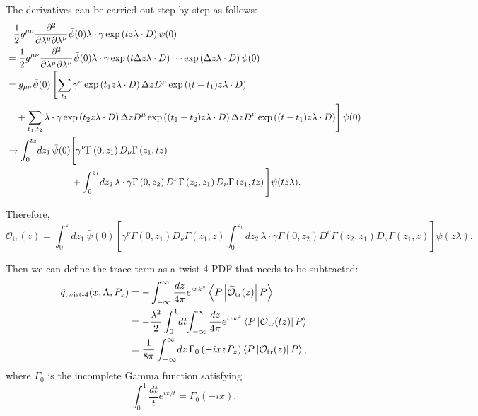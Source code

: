 The derivatives can be carried out step by step as follows:
%
\begin{align}
&\phantom{=}
  \frac{1}{2} g^{\mu\nu} \frac{\partial^2}
                              {\partial \lambda^\mu \partial \lambda^\nu}
  \bar{\psi}(0) \lambda \cdot \gamma
    \exp \left(tz\lambda \cdot D\right) \psi(0) \notag \\
%    
&= \frac{1}{2} g^{\mu\nu} \frac{\partial^2}
                               {\partial \lambda^\mu \partial \lambda^\nu}
  \bar{\psi}(0) \lambda \cdot \gamma
  \exp \left(t\Delta z\lambda \cdot D\right) \cdots
    \exp \left( \Delta z\lambda \cdot D\right) \psi(0) \notag \\
%
&= g_{\mu\nu} \bar{\psi}(0) \left[ \sum_{t_1}\gamma^\nu
  \exp \left(t_1 z\lambda \cdot D\right) \Delta z D^\mu
  \exp \left( (t-t_1) z\lambda \cdot D\right) \right.  \notag \\
&\phantom{=} \left. {}+\sum_{t_1,t_2} \lambda \cdot \gamma
  \exp \left( t_2 z\lambda \cdot D\right) \Delta z D^\mu
  \exp \left( (t_1-t_2) z\lambda \cdot D\right) \Delta z D^\nu
  \exp \left( (t-t_1) z\lambda \cdot D\right) \right]
  \psi(0)  \notag \\
%
&\rightarrow \int_0^{tz} \!dz_1\, \bar{\psi}(0) \Bigg[
  \gamma^\nu \Gamma\left(0,z_1\right) D_\nu \Gamma\left(z_1,tz\right) \notag \\
&\phantom{= \int_0^{tz} \!dz_1\, \bar{\psi}(0) \Bigg[}
  {} + \int_0^{z_1} \!dz_2\, \lambda \cdot \gamma
  \Gamma\left(0,z_2\right) D^\nu \Gamma\left(z_2,z_1\right)
  D_\nu \Gamma\left(z_1,tz\right) \Bigg] \psi(tz\lambda).
\end{align}

Therefore,
%
\begin{equation}
\mathcal{O}_\text{tr}(z) =
  \int_0^z \!dz_1\, \bar{\psi}(0) \left[
  \gamma^\nu \Gamma\left(0,z_1\right) D_\nu \Gamma\left(z_1,z\right)
  \int_0^{z_1} \!dz_2\, \lambda \cdot \gamma
  \Gamma\left(0,z_2\right) D^\nu \Gamma\left(z_2,z_1\right) D_\nu
  \Gamma\left(z_1,z\right) \right] \psi(z\lambda) .
\end{equation}

Then we can define the trace term as a twist-4 PDF that needs to be
subtracted:
%
\begin{align}\label{tildeq-twist4}
\tilde{q}_\text{twist-4}(x,\Lambda ,P_z) &=
  -\int_{-\infty}^\infty \frac{dz}{4\pi} e^{izk^z}
    \left\langle P\left\vert \widetilde{\mathcal{O}}_\text{tr}(z)
    \right\vert P\right\rangle  \notag \\
&= -\frac{\lambda^2}{2} \int_0^1 \!dt\! \int_{-\infty}^\infty
  \frac{dz}{4\pi} e^{izk^z}
  \left\langle P\left\vert \mathcal{O}_\text{tr}(tz)
  \right\vert P\right\rangle  \notag \\
&= \frac{1}{8\pi} \int_{-\infty}^\infty \!dz\,
  \Gamma_0\left(-ixzP_z\right)
  \left\langle P\left\vert \mathcal{O}_\text{tr}(z)\right\vert P\right\rangle ,
\end{align}
%
where $\Gamma_0$ is the incomplete Gamma function satisfying
%
\begin{equation}
\int_0^1 \frac{dt}{t} e^{ix/t} = \Gamma_0\left(-ix\right) .
\end{equation}
